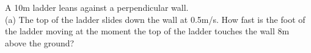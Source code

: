 \begin{exercise}\nonumber
    A 10m ladder leans against a perpendicular wall. \\

    (a) The top of the ladder slides down the wall at 0.5m/s. How fast is the foot of the ladder moving at the moment the top of the ladder touches the wall 8m above the ground? \\


\end{exercise}